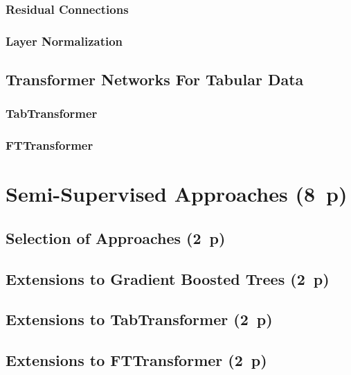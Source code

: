 \subsubsection{Residual Connections}\label{sec:residual-connections}

\subsubsection{Layer Normalization}\label{sec:layer-norm}

\subsection{Transformer Networks For Tabular Data}\label{sec:tabular-transformer}

\subsubsection{TabTransformer}\label{sec:tabtransformer}

\subsubsection{FTTransformer}\label{sec:fttransformer}


\newpage
\section{Semi-Supervised Approaches (8~p)}\label{sec:semi-supervised-approaches}

\subsection{Selection of Approaches (2~p)}\label{sec:selection-of-approaches-1}

\subsection{Extensions to Gradient Boosted
  Trees (2~p)}\label{sec:extensions-to-gradient-boosted-trees}

\subsection{Extensions to TabTransformer (2~p)}\label{sec:extensions-to-tabtransformer}

\subsection{Extensions to FTTransformer (2~p)}\label{sec:extensions-to-fttransformer}



